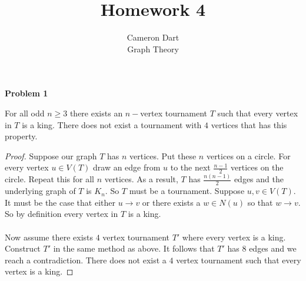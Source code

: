 \documentclass{article}
\newenvironment{claim}[2][Claim]{\begin{trivlist}
		\item[\hskip \labelsep {\bfseries #1}\hskip \labelsep {\bfseries #2}]}{\end{trivlist}}
\begin{document}
\title{Homework 4} 
\author{Cameron Dart\\ Graph Theory} 

\maketitle

\noindent \textbf{Problem 1}
\begin{claim}{}
	For all odd $n \geq 3$ there exists an $n-$vertex tournament $T$ such that every vertex in $T$ is a king. There does not exist a tournament with $4$ vertices that has this property.
\end{claim}
\begin{proof}
	Suppose our graph $T$ has $n$ vertices. Put these $n$ vertices on a circle. For every vertex $u \in V(T)$ draw an edge from $u$ to the next $\frac{n-1}{2}$ vertices on the circle. Repeat this for all $n$ vertices. As a result, $T$ has $\frac{n(n - 1)}{2}$ edges and the underlying graph of $T$ is $K_n$. So $T$ must be a tournament. Suppose $u, v \in V(T)$. It must be the case that either $u \rightarrow v$ or there exists a $w \in N(u)$ so that $w \rightarrow v$. So by definition every vertex in $T$ is a king.\\ \\
	Now assume there exists $4$ vertex tournament $T'$ where every vertex is a king. Construct $T'$ in the same method as above. It follows that $T'$ has $8$ edges and we reach a contradiction. There does not exist a $4$ vertex tournament such that every vertex is a king.
\end{proof}
\end{document}
